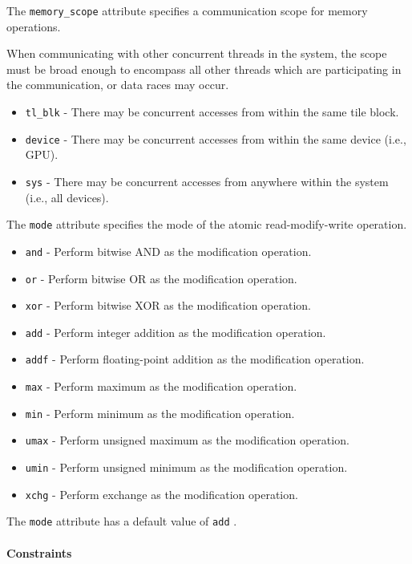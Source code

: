 \documentclass{article}
\begin{document}
The \texttt{memory\_scope} attribute specifies a communication scope for memory operations.

When communicating with other concurrent threads in the system, the scope must be broad enough to encompass all other threads which are participating in the communication, or data races may occur.


\begin{itemize}
\item \texttt{tl\_blk} - There may be concurrent accesses from within the same tile block.
\item \texttt{device} - There may be concurrent accesses from within the same device (i.e., GPU).
\item \texttt{sys} - There may be concurrent accesses from anywhere within the system (i.e., all devices).

\end{itemize}
The \texttt{mode} attribute specifies the mode of the atomic read-modify-write operation.


\begin{itemize}
\item \texttt{and} - Perform bitwise AND as the modification operation.
\item \texttt{or} - Perform bitwise OR as the modification operation.
\item \texttt{xor} - Perform bitwise XOR as the modification operation.
\item \texttt{add} - Perform integer addition as the modification operation.
\item \texttt{addf} - Perform floating-point addition as the modification operation.
\item \texttt{max} - Perform maximum as the modification operation.
\item \texttt{min} - Perform minimum as the modification operation.
\item \texttt{umax} - Perform unsigned maximum as the modification operation.
\item \texttt{umin} - Perform unsigned minimum as the modification operation.
\item \texttt{xchg} - Perform exchange as the modification operation.

\end{itemize}
The \texttt{mode} attribute has a default value of \texttt{add} .



\paragraph{Constraints}
\end{document}
